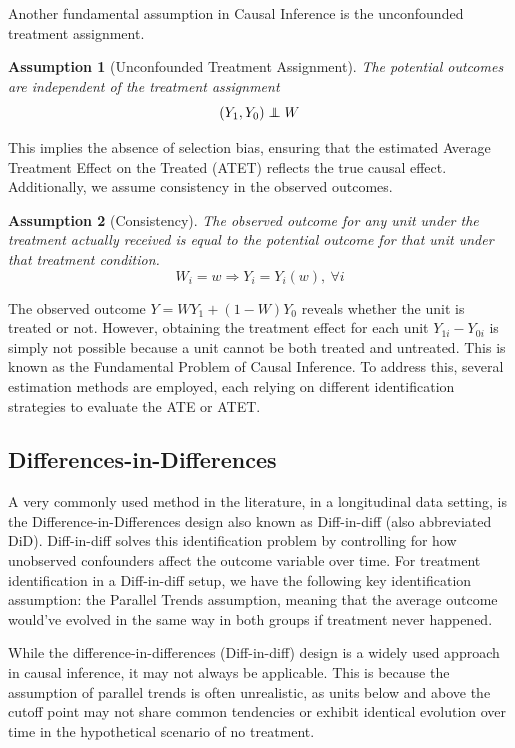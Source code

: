 \documentclass[12pt]{article}
\theoremstyle{plain}
\newtheorem{assumption}{Assumption}
\theoremstyle{remark}
\newcommand\independent{\protect\mathpalette{\protect\independenT}{\perp}}
\def\independenT#1#2{\mathrel{\rlap{$#1#2$}\mkern2mu{#1#2}}}
\begin{document}
Another fundamental assumption in Causal Inference is the unconfounded treatment assignment.

\begin{assumption}[Unconfounded Treatment Assignment]
    The potential outcomes  are independent of the treatment assignment
    \[(Y_1, Y_0) \independent W\]
\end{assumption}
This implies the absence of selection bias, ensuring that the estimated Average Treatment Effect on the Treated (ATET) reflects the true causal effect. Additionally, we assume consistency in the observed outcomes.

\begin{assumption}[Consistency]
    The observed outcome for any unit under the treatment actually received is equal to the potential outcome for that unit under that treatment condition.
    \[  W_i = w \Rightarrow  Y_i = Y_i(w),\  \forall  i\]
\end{assumption}


The observed outcome $Y = WY_1 + (1-W)Y_0$ reveals whether the unit is treated or not. However, obtaining the treatment effect for each unit $Y_{1i}-Y_{0i}$ is simply not possible because a unit cannot be both treated and untreated. This is known as the Fundamental Problem of Causal Inference. To address this, several estimation methods are employed, each relying on different identification strategies to evaluate the ATE or ATET.

\subsection{Differences-in-Differences}
A very commonly used method in the literature, in a longitudinal data setting, is the Difference-in-Differences design also known as Diff-in-diff (also abbreviated DiD). Diff-in-diff solves this identification problem by controlling for how unobserved confounders affect the outcome variable over time. For treatment identification in a Diff-in-diff setup, we have the following key identification assumption: the Parallel Trends assumption, meaning that the average outcome would've evolved in the same way in both groups if treatment never happened.

While the difference-in-differences (Diff-in-diff) design is a widely used approach in causal inference, it may not always be applicable. This is because the assumption of parallel trends is often unrealistic, as units below and above the cutoff point may not share common tendencies or exhibit identical evolution over time in the hypothetical scenario of no treatment.
\end{document}
